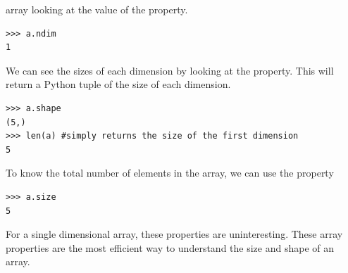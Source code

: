 array looking at the value of the  property. \begin{lstlisting}
>>> a.ndim
1 \end{lstlisting} We can see the sizes of each dimension by looking at
the  property. This will return a Python tuple of the size of
each dimension. \begin{lstlisting}
>>> a.shape
(5,)
>>> len(a) #simply returns the size of the first dimension
5 \end{lstlisting} To know the total number of elements in the array, we
can use the  property \begin{lstlisting}
>>> a.size
5 \end{lstlisting} For a single dimensional array, these properties are
uninteresting. These array properties are the most efficient way to
understand the size and shape of an array.

